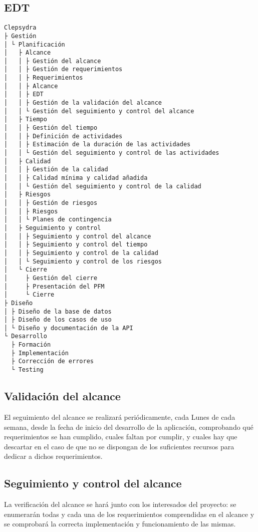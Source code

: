 \subsection{EDT}
\begin{verbatim}
Clepsydra
├ Gestión
│ └ Planificación
│   ├ Alcance
│   │ ├ Gestión del alcance
│   │ ├ Gestión de requerimientos
│   │ ├ Requerimientos
│   │ ├ Alcance
│   │ ├ EDT
│   │ ├ Gestión de la validación del alcance
│   │ └ Gestión del seguimiento y control del alcance
│   ├ Tiempo
│   │ ├ Gestión del tiempo
│   │ ├ Definición de actividades
│   │ ├ Estimación de la duración de las actividades
│   │ └ Gestión del seguimiento y control de las actividades
│   ├ Calidad
│   │ ├ Gestión de la calidad
│   │ ├ Calidad mínima y calidad añadida
│   │ └ Gestión del seguimiento y control de la calidad
│   ├ Riesgos
│   │ ├ Gestión de riesgos
│   │ ├ Riesgos
│   │ └ Planes de contingencia
│   ├ Seguimiento y control
│   │ ├ Seguimiento y control del alcance
│   │ ├ Seguimiento y control del tiempo
│   │ ├ Seguimiento y control de la calidad
│   │ └ Seguimiento y control de los riesgos
│   └ Cierre
│     ├ Gestión del cierre
│     ├ Presentación del PFM
│     └ Cierre
├ Diseño
│ ├ Diseño de la base de datos
│ ├ Diseño de los casos de uso
│ └ Diseño y documentación de la API
└ Desarrollo
  ├ Formación
  ├ Implementación
  ├ Corrección de errores
  └ Testing
\end{verbatim}

\subsection{Validación del alcance}
El seguimiento del alcance se realizará periódicamente, cada Lunes de cada
semana, desde la fecha de inicio del desarrollo de la aplicación, comprobando
qué requerimientos se han cumplido, cuales faltan por cumplir, y cuales hay
que descartar en el caso de que no se dispongan de los suficientes recursos
para dedicar a dichos requerimientos.

\subsection{Seguimiento y control del alcance}
La verificación del alcance se hará junto con los interesados del proyecto:
se enumerarán todas y cada una de los requerimientos comprendidas en el alcance
y se comprobará la correcta implementación y funcionamiento de las mismas.
